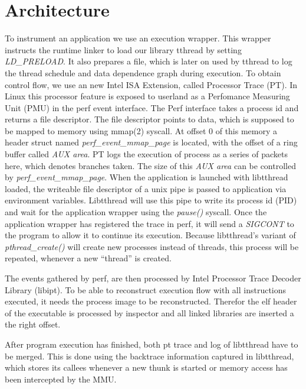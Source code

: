 \section{Architecture}
\label{sec:introduction}

To instrument an application we use an execution wrapper. This wrapper instructs
the runtime linker to load our library tthread by setting \emph{LD\_PRELOAD}. It
also prepares a file, which is later on used by tthread to log the thread
schedule and data dependence graph during execution. To obtain control flow, we
use an new Intel ISA Extension, called Processor Trace (PT). In Linux this
processor feature is exposed to userland as a Perfomance Measuring Unit (PMU) in
the perf event interface. The Perf interface takes a process id and returns a
file descriptor. The file descriptor points to data, which is supposed to be
mapped to memory using mmap(2) syscall. At offset 0 of this memory a header
struct named \emph{perf_event_mmap_page} is located, with the offset of a ring
buffer called \emph{AUX area}. PT logs the execution of process as a series of
packets here, which denotes branches taken. The size of this \emph{AUX area}
can be controlled by \emph{perf_event_mmap_page}. When the application is
launched with libtthread loaded, the writeable file descriptor of a unix pipe is
passed to application via environment variables. Libtthread will use this pipe
to write its process id (PID) and wait for the application wrapper using the
\emph{pause()} syscall. Once the application wrapper has registered the trace in
perf, it will send a \emph{SIGCONT} to the program to allow it to continue its
execution. Because libtthread's variant of \emph{pthread\_create()} will create
new processes instead of threads, this process will be repeated, whenever a new
"`thread"' is created.

The events gathered by perf, are then processed by Intel Processor Trace Decoder
Library (libipt). To be able to reconstruct execution flow with all
instructions executed, it needs the process image to be reconstructed. Therefor
the elf header of the executable is processed by inspector and all linked
libraries are inserted a the right offset.

After program execution has finished, both pt trace and log of libtthread have
to be merged. This is done using the backtrace information captured in
libtthread, which stores its callees whenever a new thunk is started or memory
access has been intercepted by the MMU.
